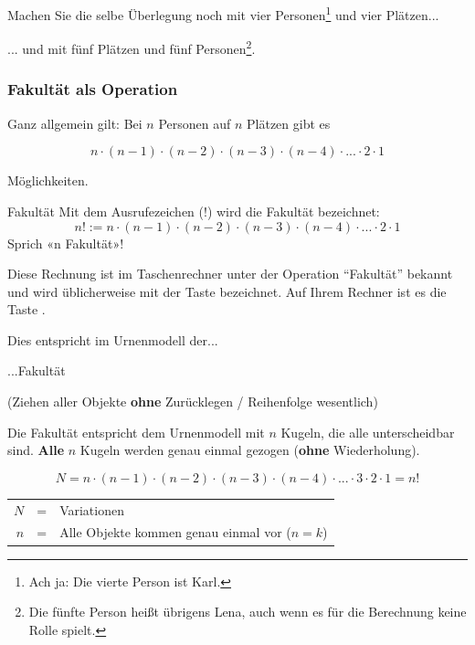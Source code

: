 Machen Sie die selbe Überlegung noch mit vier Personen\footnote{Ach ja: Die vierte Person ist Karl.} und vier
Plätzen...



... und mit fünf Plätzen und fünf Personen\footnote{Die fünfte Person heißt übrigens Lena, auch wenn es für die Berechnung keine Rolle spielt.}.

\newpage


\subsubsection{Fakultät als Operation}

Ganz allgemein gilt: Bei $n$ Personen auf $n$ Plätzen gibt es

$$n\cdot{} (n-1) \cdot{} (n-2) \cdot{} (n-3) \cdot{} (n-4) \cdot{}
... \cdot{} 2 \cdot{} 1$$

Möglichkeiten.

\begin{definition}{Fakultät}{}
  Mit dem Ausrufezeichen ($!$) wird die Fakultät bezeichnet:
  $$n! := n\cdot{}(n-1) \cdot{} (n-2) \cdot{} (n-3) \cdot{} (n-4) \cdot{}
  ... \cdot{} 2 \cdot{} 1$$
  Sprich «n Fakultät»!
  \end{definition}

Diese Rechnung ist im Taschenrechner unter der Operation ``Fakultät''
bekannt und wird üblicherweise mit der Taste  bezeichnet. Auf
Ihrem Rechner ist es die Taste .

Dies entspricht im Urnenmodell der...
\begin{gesetz}{...Fakultät}{}

  (Ziehen aller Objekte \textbf{ohne} Zurücklegen / Reihenfolge wesentlich)


Die Fakultät entspricht dem Urnenmodell mit $n$ Kugeln, die
alle unterscheidbar sind. \textbf{Alle} $n$ Kugeln werden genau einmal
gezogen (\textbf{ohne} Wiederholung).

$$N = n\cdot{} (n-1) \cdot{} (n-2) \cdot{} (n-3) \cdot{}
(n-4) \cdot{} ... \cdot{} 3\cdot{} 2 \cdot{} 1 = n!$$

\begin{tabular}{rcl}
  $N$ &=& Variationen\\
  $n$ &=& Alle Objekte kommen genau einmal vor ($n=k$) 
\end{tabular}

\end{gesetz}
\newpage


